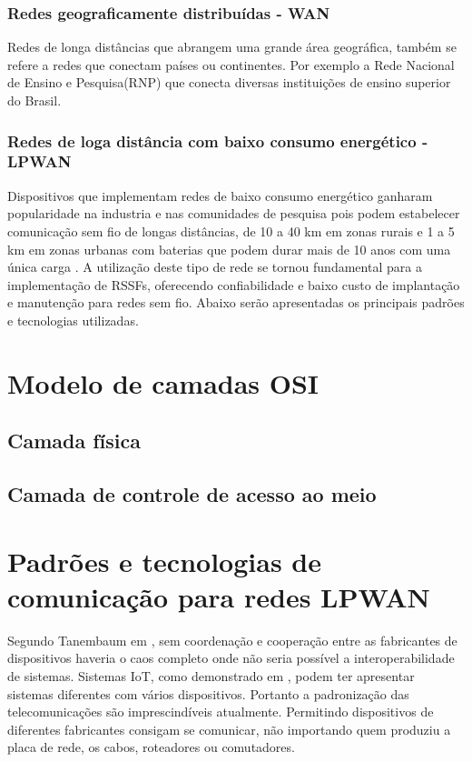\subsubsection*{Redes geograficamente distribuídas - WAN}
Redes de longa distâncias que abrangem uma grande área geográfica, também se refere a redes que conectam países ou continentes. Por exemplo a Rede Nacional de Ensino e Pesquisa(RNP) que conecta diversas instituições de ensino superior do Brasil.

\subsubsection*{Redes de loga distância com baixo consumo energético - LPWAN}
Dispositivos que implementam redes de baixo consumo energético ganharam popularidade na industria e nas comunidades de pesquisa pois podem estabelecer comunicação sem fio de longas distâncias, de 10 a 40 km em zonas rurais e 1 a 5 km em zonas urbanas com baterias que podem durar mais de 10 anos com uma única carga \cite{mekki2019comparative}. A utilização deste tipo de rede se tornou fundamental para a implementação de RSSFs, oferecendo confiabilidade e baixo custo de implantação e manutenção para redes sem fio. Abaixo serão apresentadas os principais padrões e tecnologias utilizadas.

\section{Modelo de camadas OSI}
\label{osi}
\subsection{Camada física}
\subsection{Camada de controle de acesso ao meio}


\section{Padrões e tecnologias de comunicação para redes LPWAN}
\label{padrõesSF}
Segundo Tanembaum em \cite{tanembaum2011}, sem coordenação e cooperação entre as fabricantes de dispositivos haveria o caos completo onde não seria possível a interoperabilidade de sistemas. Sistemas IoT, como demonstrado em \cite{sotres2017practical}, podem ter apresentar sistemas diferentes com vários dispositivos. Portanto a padronização das telecomunicações são imprescindíveis atualmente. Permitindo dispositivos de diferentes fabricantes consigam se comunicar, não importando quem produziu a placa de rede, os cabos, roteadores ou comutadores.

